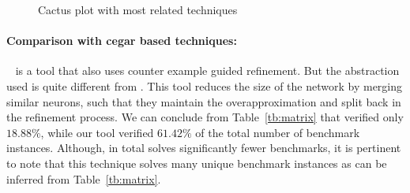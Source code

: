 \begin{figure}[t]
    
    \caption{Cactus plot with most related techniques}
    \label{res:milp_with_milp}
\end{figure}








\paragraph{Comparison with cegar based techniques: }
\cegarnn{}~\cite{elboher2020abstraction} is a tool that also uses  counter example guided refinement. But the abstraction used is quite different from \deeppoly{}. This tool reduces the size of the network by merging similar neurons, such that they maintain the overapproximation and split back in the refinement process. We can conclude from Table~\ref{tb:matrix} that \cegarnn{} verified only  $18.88\%$, while our tool verified $61.42\%$ of the total number of benchmark instances. Although, in total \cegarnn{} solves significantly fewer benchmarks, it is pertinent to note that this technique solves many unique benchmark instances as can be inferred from Table~\ref{tb:matrix}. %


